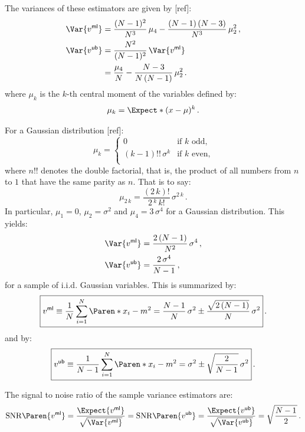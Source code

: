 \documentclass[a4paper,11pt,twoside]{scrartcl}
\newcommand{\oops}[1]{\textcolor[named]{BrickRed}{#1}}
\newcommand*{\Tag}[1]{\mathsf{#1}}
\theoremstyle{plain} %
\theoremstyle{definition}
\theoremstyle{remark}
\begin{document}
The variances of these estimators are given by \oops{[ref]}:
\begin{align}
 \Var{v^\Tag{ml}}
 &= \frac{(N - 1)^2}{N^3}\,\mu_4 - \frac{(N-1)\,(N - 3)}{N^3}\,\mu_2^2 \, , \\
 \Var{v^\Tag{ub}} &= \frac{N^2}{(N - 1)^2} \, \Var{v^\Tag{ml}} \notag\\
 &= \frac{\mu_4}{N} - \frac{N - 3}{N\,(N - 1)}\,\mu_2^2 \, .
\end{align}
where $\mu_k$ is the $k$-th central moment of the variables defined by:
\begin{equation}
  \mu_k = \Expect*{(x - \mu)^k} \, .
\end{equation}

For a Gaussian distribution \oops{[ref]}:
\begin{equation}
  \mu_k = \begin{cases}
    0 & \text{if $k$ odd,}\\
    (k-1)!!\,\sigma^k & \text{if $k$ even,}\\
  \end{cases}
\end{equation}
where $n!!$ denotes the double factorial, that is, the product of all
numbers from $n$ to $1$ that have the same parity as $n$.  That is to say:
\begin{equation}
  \mu_{2\,k} = \frac{(2\,k)!}{2\,^k\,k!}\,\sigma^{2\,k} \, .
\end{equation}
In particular, $\mu_1=0$, $\mu_2 = \sigma^2$ and $\mu_4 = 3\,\sigma^4$ for
a Gaussian distribution.  This yields:
\begin{align}
 \Var{v^\Tag{ml}}
 &= \frac{2\,(N - 1)}{N^2}\,\sigma^4 \, , \\
 \Var{v^\Tag{ub}}
 &= \frac{2\,\sigma^4}{N - 1} \, ,
\end{align}
for a sample of i.i.d. Gaussian variables.  This is summarized by:
\begin{equation}
  \boxed{
    v^\Tag{ml} \equiv \frac{1}{N} \sum_{i=1}^N \Paren*{x_i - m}^2
    = \frac{N - 1}{N} \, \sigma^2 \pm \frac{\sqrt{2\,(N - 1)}}{N} \,\sigma^2
  }\,.
  \label{eq:biased-sample-variance-summary}
\end{equation}
and by:
\begin{equation}
  \boxed{
    v^\Tag{ub} \equiv \frac{1}{N - 1} \sum_{i=1}^N \Paren*{x_i - m}^2
    = \sigma^2 \pm \sqrt{\frac{2}{N - 1}} \,\sigma^2
  }\,.
  \label{eq:unbiased-sample-variance-summary}
\end{equation}

The signal to noise ratio of the sample variance estimators are:
\begin{equation}
  \mathrm{SNR}\Paren{v^\Tag{ml}}
  = \frac{\Expect{v^\Tag{ml}}}{\sqrt{\Var{v^\Tag{ml}}}}
  = \mathrm{SNR}\Paren{v^\Tag{ub}}
  = \frac{\Expect{v^\Tag{ub}}}{\sqrt{\Var{v^\Tag{ub}}}}
  = \sqrt{\frac{N - 1}{2}} \, .
\end{equation}




\end{document}
